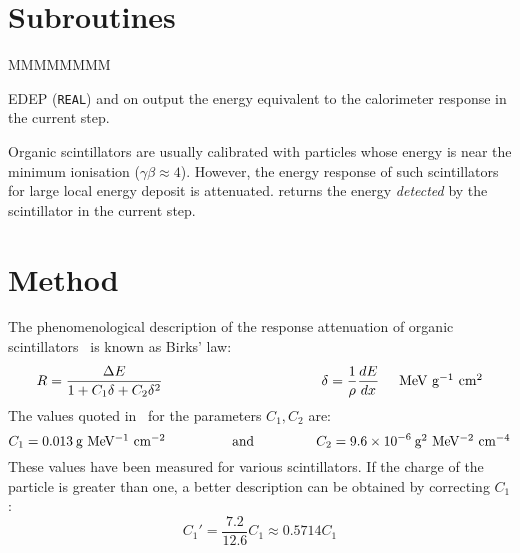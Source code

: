  
\section{Subroutines}

\begin{DLtt}{MMMMMMMM}
\item[EDEP] ({\tt REAL}) and on output the energy
equivalent to the calorimeter response in the current step.
\end{DLtt}

Organic scintillators are usually calibrated with particles whose
energy is near the minimum ionisation ($\gamma \beta \approx 4$).
However, the energy response of such scintillators 
for large local energy deposit is
attenuated.  returns the energy {\it detected} by
the scintillator in the current step.

\section{Method}

The phenomenological description of the response attenuation of
organic scintillators~\cite{bib-BIRK} is known as Birks' law:
\begin{equation}
R = \frac{\Delta E}{1 + C_1 \delta + C_2 \delta^2} 
\hspace{4cm}
\delta = \frac{1}{\rho} \frac{dE}{dx} \hspace{0.5cm} 
\mbox{MeV g$^{-1}$ cm$^{2}$}
\end{equation}
The values quoted in~\cite{bib-BIR1} for the parameters $C_1, C_2$
are:
\[
C_1 = 0.013 \: \mbox{g MeV$^{-1}$ cm$^{-2}$ \hspace{1.5cm} and \hspace{1.5cm}}
C_2 = 9.6 \times 10^{-6} \: \mbox{g$^{2}$ MeV$^{-2}$ cm$^{-4}$}
\]
These values have been measured for various scintillators.
If the charge of the particle is greater than one, a better description
can be obtained by correcting $C_1$:
\begin{equation}
\label{eq:phys337-1}
C_1' = \frac{7.2}{12.6} C_1 \approx 0.5714 C_1
\end{equation}

